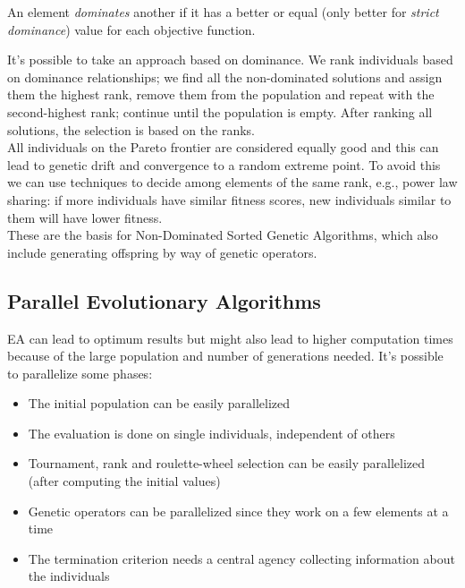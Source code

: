 \begin{definition}
	An element \textit{dominates} another if it has a better or equal (only better for \textit{strict dominance}) value for each objective function.\\
\end{definition}

It's possible to take an approach based on dominance. We rank individuals based on dominance relationships; we find all the non-dominated solutions and assign them the highest rank, remove them from the population and repeat with the second-highest rank; continue until the population is empty. After ranking all solutions, the selection is based on the ranks.\\

All individuals on the Pareto frontier are considered equally good and this can lead to genetic drift and convergence to a random extreme point. To avoid this we can use techniques to decide among elements of the same rank, e.g., power law sharing: if more individuals have similar fitness scores, new individuals similar to them will have lower fitness.\\

These are the basis for Non-Dominated Sorted Genetic Algorithms, which also include generating offspring by way of genetic operators.\\

\subsection{Parallel Evolutionary Algorithms}
EA can lead to optimum results but might also lead to higher computation times because of the large population and number of generations needed. It's possible to parallelize some phases: 
\begin{itemize}
	\item The initial population can be easily parallelized
	\item The evaluation is done on single individuals, independent of others 
	\item Tournament, rank and roulette-wheel selection can be easily parallelized (after computing the initial values)
	\item Genetic operators can be parallelized since they work on a few elements at a time
	\item The termination criterion needs a central agency collecting information about the individuals
\end{itemize} 

